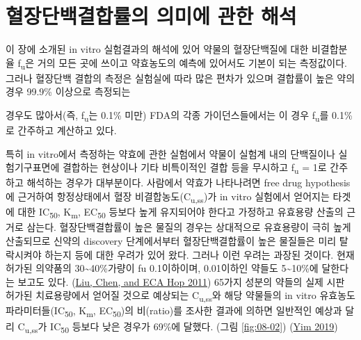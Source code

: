 \documentclass[
  11pt,
  krantz2, a4paper, twoside]{krantz}
\begin{document}
\hypertarget{uxd608uxc7a5uxb2e8uxbc31uxacb0uxd569uxb960uxc758-uxc758uxbbf8uxc5d0-uxad00uxd55c-uxd574uxc11d}{%
\section{혈장단백결합률의 의미에 관한 해석}\label{uxd608uxc7a5uxb2e8uxbc31uxacb0uxd569uxb960uxc758-uxc758uxbbf8uxc5d0-uxad00uxd55c-uxd574uxc11d}}

이 장에 소개된 in vitro 실험결과의 해석에 있어 약물의 혈장단백질에 대한
비결합분율 f\textsubscript{u}은 거의 모든 곳에 쓰이고 약효농도의 예측에 있어서도
기본이 되는 측정값이다. 그러나 혈장단백 결합의 측정은 실험실에 따라 많은
편차가 있으며 결합률이 높은 약의 경우 99.9\% 이상으로 측정되는

경우도 많아서(즉, f\textsubscript{u}는 0.1\% 미만) FDA의 각종 가이던스들에서는 이 경우
f\textsubscript{u}를 0.1\%로 간주하고 계산하고 있다.

특히 in vitro에서 측정하는 약효에 관한 실험에서 약물이 실험계 내의
단백질이나 실험기구표면에 결합하는 현상이나 기타 비특이적인 결합 등을
무시하고 f\textsubscript{u} = 1로 간주하고 해석하는 경우가 대부분이다. 사람에서 약효가
나타나려면 free drug hypothesis에 근거하여 항정상태에서 혈장
비결합농도(C\textsubscript{u,ss})가 in vitro 실험에서 얻어지는 타겟에 대한 IC\textsubscript{50},
K\textsubscript{m}, EC\textsubscript{50} 등보다 높게 유지되어야 한다고 가정하고 유효용량 산출의
근거로 삼는다. 혈장단백결합률이 높은 물질의 경우는 상대적으로 유효용량이
극히 높게 산출되므로 신약의 discovery 단계에서부터 혈장단백결합률이 높은
물질들은 미리 탈락시켜야 하는지 등에 대한 우려가 있어 왔다. 그러나 이런
우려는 과장된 것이다. 현재 허가된 의약품의 30\textasciitilde40\%가량이 fu 0.1이하이며,
0.01이하인 약들도 5\textasciitilde10\%에 달한다는 보고도 있다. (\protect\hyperlink{ref-liu2011we}{Liu, Chen, and ECA Hop 2011}) 65가지 성분의 약들의 실제 시판
허가된 치료용량에서 얻어질 것으로 예상되는 C\textsubscript{u,ss}와 해당 약물들의 in
vitro 유효농도 파라미터들(IC\textsubscript{50}, K\textsubscript{m}, EC\textsubscript{50})의 비(ratio)를 조사한
결과에 의하면 일반적인 예상과 달리 C\textsubscript{u,ss}가 IC\textsubscript{50} 등보다 낮은 경우가
69\%에 달했다. (그림 \ref{fig:08-02}) (\protect\hyperlink{ref-yim2019potency}{Yim 2019})
\end{document}
